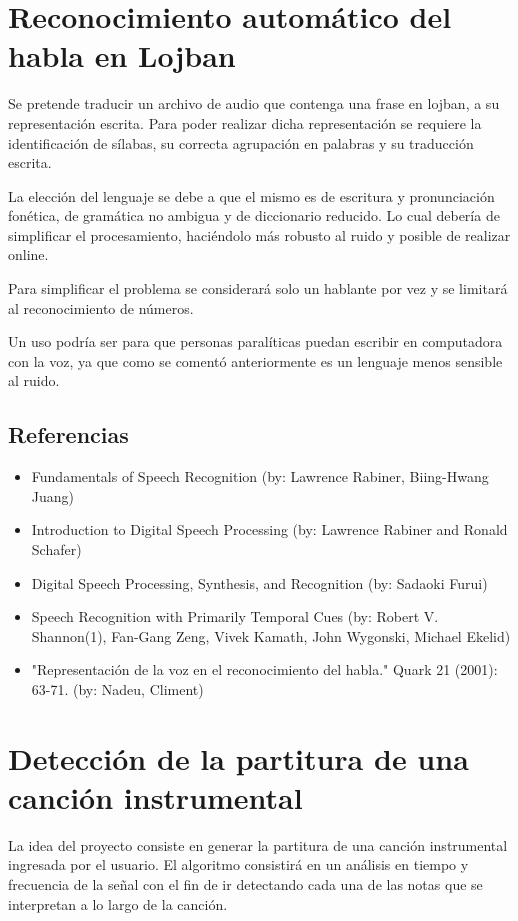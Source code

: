 \documentclass[a4paper,10pt]{article}
\begin{document}
\section*{Reconocimiento automático del habla en Lojban}
	Se pretende traducir un archivo de audio que contenga una
	frase en lojban, a su representación escrita. Para poder realizar
	dicha representación se requiere la identificación de sílabas,
	su correcta agrupación en palabras y su traducción escrita.

	La elección del lenguaje se debe a que el mismo es de escritura
	y pronunciación fonética, de gramática no ambigua y de
	diccionario reducido. Lo cual debería de simplificar el
	procesamiento, haciéndolo más robusto al ruido y posible de
	realizar online.

	Para simplificar el problema se considerará solo un hablante
	por vez y se limitará al reconocimiento de números.

	Un uso podría ser para que personas paralíticas puedan escribir
	en computadora con la voz, ya que como se comentó anteriormente
	es un lenguaje menos sensible al ruido.

	\subsection*{Referencias}
		\begin{itemize}
			\item Fundamentals of Speech Recognition (by:
			Lawrence Rabiner, Biing-Hwang Juang)
			\item Introduction to Digital Speech Processing
			(by: Lawrence Rabiner and Ronald Schafer)
			\item Digital Speech Processing, Synthesis,
			and Recognition (by: Sadaoki Furui)
			\item Speech Recognition with Primarily Temporal
			Cues (by: Robert V. Shannon(1), Fan-Gang Zeng,
			Vivek Kamath, John Wygonski, Michael Ekelid)
			\item "Representación de la voz en el
			reconocimiento del habla." Quark 21 (2001):
			63-71. (by: Nadeu, Climent)
		\end{itemize}
	
	\clearpage

\section*{Detección de la partitura de una canción instrumental}
	La idea del proyecto consiste en generar la partitura de una
	canción instrumental ingresada por el usuario.  El algoritmo
	consistirá en un análisis en tiempo y frecuencia  de la
	señal con el fin de ir detectando cada una de las notas que se
	interpretan a lo largo de la canción.
\end{document}
